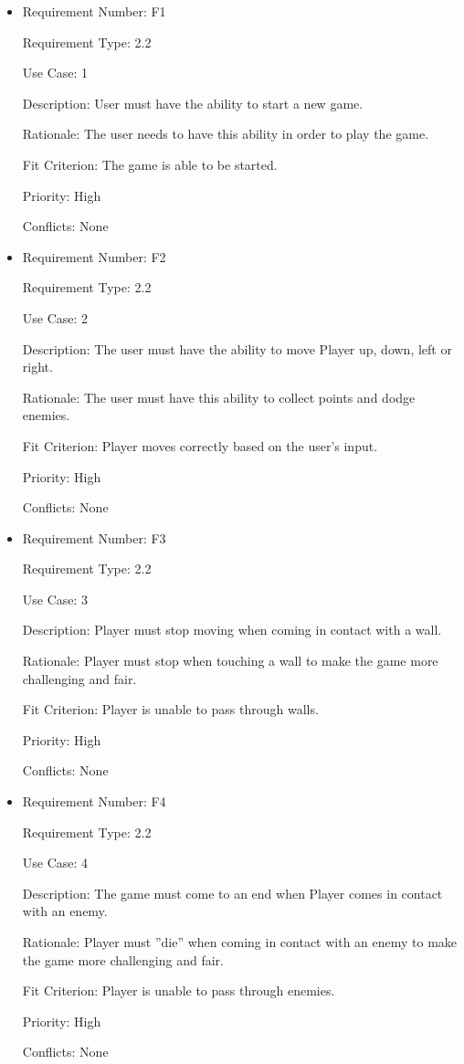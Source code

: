 \documentclass[12pt, titlepage]{article}
\begin{document}
\begin{itemize}
\item
Requirement Number: F1

Requirement Type: 2.2

Use Case: 1

Description: User must have the ability to start a new game.

Rationale: The user needs to have this ability in order to play the game.

Fit Criterion: The game is able to be started.

Priority: High

Conflicts: None
\end{itemize}

\begin{itemize}
\item
Requirement Number: F2

Requirement Type: 2.2

Use Case: 2

Description: The user must have the ability to move Player up, down, left or right.

Rationale: The user must have this ability to collect points and dodge enemies.

Fit Criterion: Player moves correctly based on the user’s input.

Priority: High

Conflicts: None
\end{itemize}

\begin{itemize}
\item
Requirement Number: F3 

Requirement Type: 2.2

Use Case: 3

Description: Player must stop moving when coming in contact with a wall.

Rationale: Player must stop when touching a wall to make the game more challenging and fair.

Fit Criterion: Player is unable to pass through walls.

Priority: High

Conflicts: None
\end{itemize}

\begin{itemize}
\item
Requirement Number: F4

Requirement Type: 2.2

Use Case: 4

Description: The game must come to an end when Player comes in contact with an enemy.

Rationale: Player must ''die'' when coming in contact with an enemy to make the game more challenging and fair.

Fit Criterion: Player is unable to pass through enemies.

Priority: High

Conflicts: None
\end{itemize}
\end{document}
